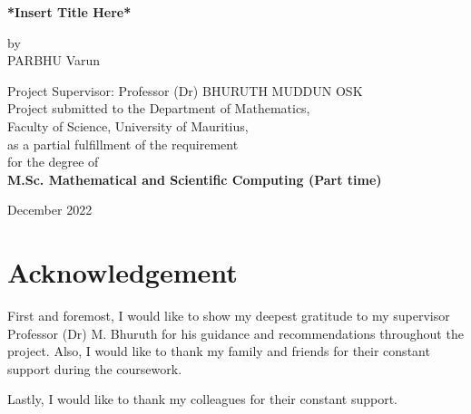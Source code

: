 \documentclass[a4paper,12pt,hidelinks]{report}
\begin{document}
\begin{titlepage}
\begin{center}
\begin{huge}
\textbf{*Insert Title Here*}\\
\end{huge}
\vspace{10mm}
\begin{huge}
by \\
PARBHU Varun \\ 
\end{huge}
\begin{large}
\vspace{15mm}
Project Supervisor: Professor (Dr) BHURUTH MUDDUN OSK \\
\vspace{15mm}
Project submitted to the Department of Mathematics,\\
Faculty of Science, University of Mauritius,\\
as a partial fulfillment of the requirement\\
for the degree of\\
\textbf{M.Sc. Mathematical and Scientific Computing (Part time)}\\
\end{large}
\vspace{30mm}
December 2022
\end{center}
\end{titlepage}
\tableofcontents


\listoffigures
{}

\listoftables
{}

\chapter*{Acknowledgement}
First and foremost, I would like to show my deepest gratitude to my supervisor Professor (Dr) M. Bhuruth for his guidance and recommendations throughout the project. Also, I would like to thank my family and friends for their constant support during the coursework.

\noindent Lastly, I would like to thank my colleagues for their constant support.
\end{document}
